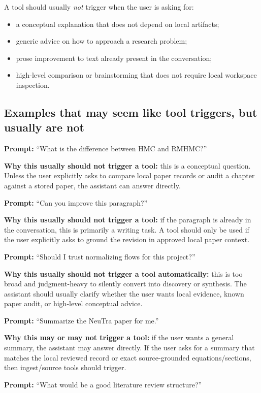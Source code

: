 \documentclass[11pt,a4paper,openany]{book}
\begin{document}
A tool should usually \emph{not} trigger when the user is asking for:
\begin{itemize}[nosep]
  \item a conceptual explanation that does not depend on local artifacts;
  \item generic advice on how to approach a research problem;
  \item prose improvement to text already present in the conversation;
  \item high-level comparison or brainstorming that does not require local
        workspace inspection.
\end{itemize}

\subsection{Examples that may seem like tool triggers, but usually are not}

\textbf{Prompt:} ``What is the difference between HMC and RMHMC?''

\textbf{Why this usually should not trigger a tool:} this is a conceptual
question. Unless the user explicitly asks to compare local paper records or audit
a chapter against a stored paper, the assistant can answer directly.

\textbf{Prompt:} ``Can you improve this paragraph?''

\textbf{Why this usually should not trigger a tool:} if the paragraph is already
in the conversation, this is primarily a writing task. A tool should only be
used if the user explicitly asks to ground the revision in approved local paper
context.

\textbf{Prompt:} ``Should I trust normalizing flows for this project?''

\textbf{Why this usually should not trigger a tool automatically:} this is too
broad and judgment-heavy to silently convert into discovery or synthesis. The
assistant should usually clarify whether the user wants local evidence, known
paper audit, or high-level conceptual advice.

\textbf{Prompt:} ``Summarize the NeuTra paper for me.''

\textbf{Why this may or may not trigger a tool:} if the user wants a general
summary, the assistant may answer directly. If the user asks for a summary that
matches the local reviewed record or exact source-grounded equations/sections,
then ingest/source tools should trigger.

\textbf{Prompt:} ``What would be a good literature review structure?''
\end{document}
